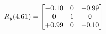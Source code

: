 \documentclass[preview]{standalone}
\begin{document}
\begin{align*}
\special{dvisvgm:raw <g id='unique000'>}R_{y}(4.61) = \begin{bmatrix}-0.10 & 0 & -0.99 \\0 & 1 & 0 \\+0.99 & 0 & -0.10\end{bmatrix}\special{dvisvgm:raw </g>}
\end{align*}
\end{document}
